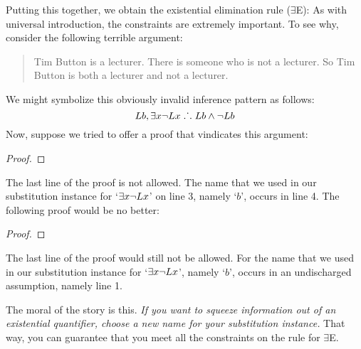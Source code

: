 Putting this together, we obtain the existential elimination rule ($\exists$E):
As with universal introduction, the constraints are extremely important. To see why, consider the following terrible argument:
	\begin{quote}
		Tim Button is a lecturer. There is someone who is not a lecturer. So Tim Button is both a lecturer and not a lecturer.
	\end{quote}
We might symbolize this obviously invalid inference pattern as follows:
$$Lb, \exists x \neg Lx \mathrel{\ldotp\dot{}\,\ldotp} Lb \wedge \neg Lb$$
Now, suppose we tried to offer a proof that vindicates this argument:
\begin{proof}
	\open	
	\close
\end{proof}
The last line of the proof is not allowed. The name that we used in our substitution instance for `$\exists x \neg Lx$' on line 3, namely `$b$', occurs in line 4. The following proof would be no better:
\begin{proof}
	\open	
	\close
\end{proof}
The last line of the proof would still not be allowed. For the name that we used in our substitution instance for `$\exists x \neg Lx$', namely `$b$', occurs in an undischarged assumption, namely line 1. 

The moral of the story is this. \emph{If you want to squeeze information out of an existential quantifier, choose a new name for your substitution instance.} That way, you can guarantee that you meet all the constraints on the rule for $\exists$E.

